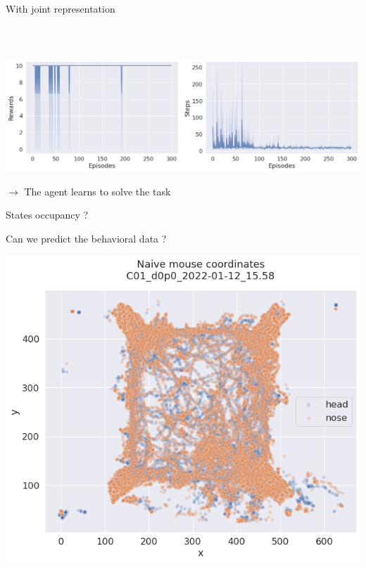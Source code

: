 \documentclass[bigger]{beamer}
\begin{document}
\begin{frame}[label={sec:org0d39be9}]{With joint representation}
\begin{columns}
\begin{column}{0.5\columnwidth}
\begin{center}
\end{center}
\end{column}
\end{columns}
\begin{block}{~}
\vspace{-2em}
\begin{center}
\includegraphics[height=0.4\textheight]{img/rewards-steps-allo-joint-repr.png}
\end{center}
\(\to\) The agent learns to solve the task
\end{block}
\end{frame}
\begin{frame}[label={sec:orgc85aed6}]{States occupancy ?}
\end{frame}
\begin{frame}[label={sec:orge816f9f}]{Can we predict the behavioral data ?}
\begin{center}
\includegraphics[width=.9\linewidth]{img/naive-mouse-coords.png}
\end{center}
\end{frame}
\end{document}
